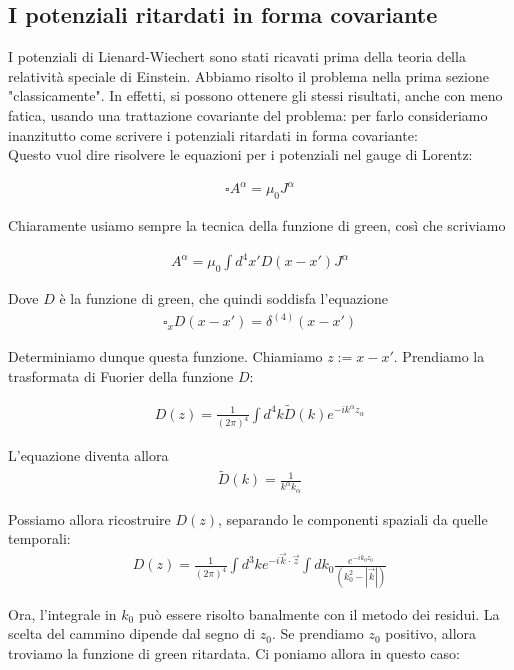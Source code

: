 \documentclass{report}
\begin{document}
\subsection{I potenziali ritardati in forma covariante}

I potenziali di Lienard-Wiechert sono stati ricavati prima della teoria della relatività speciale di Einstein. Abbiamo risolto il problema nella prima sezione "classicamente". In effetti, si possono ottenere gli stessi risultati, anche con meno fatica, usando una trattazione covariante del problema: per farlo consideriamo inanzitutto come scrivere i potenziali ritardati in forma covariante:  \\

Questo vuol dire risolvere le equazioni per i potenziali nel gauge di Lorentz: 

\begin{align}
    \square A^{\alpha} = \mu_0 J^{\alpha}
\end{align}

Chiaramente usiamo sempre la tecnica della funzione di green, così che scriviamo 

\begin{align}
    A^{\alpha} = \mu_0 \int d^4x' D(x-x')J^{\alpha}
\end{align}

Dove \(D\) è la funzione di green, che quindi soddisfa l'equazione
\begin{align}
    \square_x D(x-x') = \delta^{(4)}(x-x')
\end{align}

Determiniamo dunque questa funzione. Chiamiamo \(z := x - x'\). Prendiamo la trasformata di Fuorier della funzione \(D\): 

\begin{align}
    D(z) = \frac{1}{(2\pi)^4}\int d^4k \tilde{D}(k)e^{-ik^{\alpha}z_{\alpha}}
\end{align}

L'equazione diventa allora 
\begin{align}
    \tilde{D}(k) = \frac{1}{k^{\alpha}k_{\alpha}}
\end{align}

Possiamo allora ricostruire \(D(z)\), separando le componenti spaziali da quelle temporali: 
\begin{align}
    D(z) = \frac{1}{(2\pi)^4}\int d^3k e^{-i\vec{k}\cdot\vec{z}}\int dk_0  \frac{e^{-ik_0z_0}}{(k_0^2 - |\vec{k}|)}
\end{align}

Ora, l'integrale in \(k_0\) può essere risolto banalmente con il metodo dei residui. La scelta del cammino dipende dal segno di \(z_0\). Se prendiamo \(z_0\) positivo, allora troviamo la funzione di green ritardata. Ci poniamo allora in questo caso: \\
\end{document}
